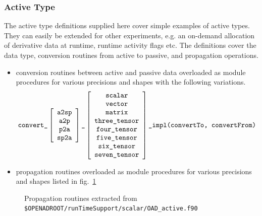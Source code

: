 \documentclass{book}
\newcommand{\reffig}[1]{{fig.~\ref{#1}}}
\begin{document}
\subsubsection{Active Type}
The active type definitions supplied here cover simple examples of active types. 
They can easily be extended for other experiments, e.g. an on-demand  allocation of 
derivative data at runtime, runtime activity flags etc. 
The definitions cover the data type, conversion routines from active to passive, 
and propagation operations.
\begin{itemize}
\item conversion routines between active and passive data overloaded as module procedures for various  precisions and shapes with the following variations.
$$
\mbox{\tt convert\_}
\left[\begin{array}{c}
\mbox{\tt a2sp} \\
\mbox{\tt a2p} \\
\mbox{\tt p2a} \\
\mbox{\tt sp2a}
\end{array}\right]
\mbox{\tt \_}
\left[\begin{array}{c}
\mbox{\tt scalar} \\
\mbox{\tt vector} \\
\mbox{\tt matrix} \\
\mbox{\tt three\_tensor}\\
\mbox{\tt four\_tensor}\\
\mbox{\tt five\_tensor}\\
\mbox{\tt six\_tensor}\\
\mbox{\tt seven\_tensor}\\
\end{array}\right]
\mbox{\tt \_impl(convertTo, convertFrom)}
$$
\item propagation routines overloaded as module procedures for various precisions and shapes listed in \reffig{fig:runtimeActive}
\end{itemize} 
\begin{figure}
\begin{minipage}[t]{.48\linewidth}
\scriptsize
\end{minipage}
\hspace{.02\linewidth}
\begin{minipage}[t]{.48\linewidth}
\scriptsize
\end{minipage}
\caption{Propagation routines extracted from \lstinline{$OPENADROOT/runTimeSupport/scalar/OAD_active.f90} %
}\label{fig:runtimeActive}
\end{figure}
\end{document}
